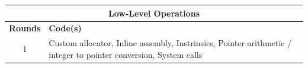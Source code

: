 \centering
\small
\begin{tabular}{|c|p{10cm}|}
\hline
\multicolumn{2}{|c|}{\textbf{Low-Level Operations}}                                                                                                                                    \\ \hline
\multicolumn{1}{|c|}{\textbf{Rounds}} & \textbf{Code(s)}                                                                                                                      \\ \hline
\multicolumn{1}{|c|}{1}               & \multicolumn{1}{p{10cm}|}{Custom allocator, Inline assembly, Instrinsics, Pointer arithmetic / integer to pointer conversion, System calls} \\ \hline
\end{tabular}
